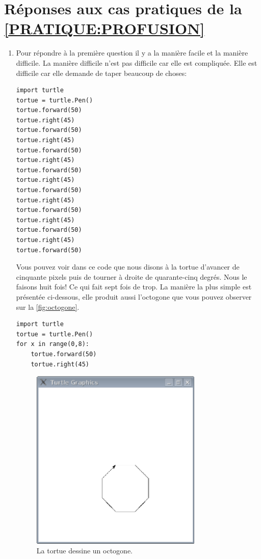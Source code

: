\section{Réponses aux cas pratiques de la \autoref{PRATIQUE:PROFUSION}\label{REPONSES:PROFUSION}}
\begin{enumerate}
\item Pour répondre à la première question il y a la manière facile et la manière difficile. La manière difficile n'est pas difficile car elle est compliquée. Elle est difficile car elle demande de taper beaucoup de choses:
\begin{Verbatim}[frame=single,rulecolor=\color{gray}, label=na pas saisir]
import turtle
tortue = turtle.Pen()
tortue.forward(50)
tortue.right(45)
tortue.forward(50)
tortue.right(45)
tortue.forward(50)
tortue.right(45)
tortue.forward(50)
tortue.right(45)
tortue.forward(50)
tortue.right(45)
tortue.forward(50)
tortue.right(45)
tortue.forward(50)
tortue.right(45)
tortue.forward(50)
\end{Verbatim}

Vous pouvez voir dans ce code que nous disons à la tortue d'avancer de cinquante pixels puis de tourner à droite de quarante-cinq degrés. Nous le faisons huit fois! Ce qui fait sept fois de trop. La manière la plus simple est présentée ci-dessous, elle produit aussi l'octogone que vous pouvez observer sur la \autoref{fig:octogone}.
\begin{Verbatim}[frame=single,rulecolor=\color{mbleu}, label=à taper]
import turtle
tortue = turtle.Pen()
for x in range(0,8):
    tortue.forward(50)
    tortue.right(45)
\end{Verbatim}

\begin{figure}
\begin{center}
\includegraphics[width=82mm]{images/octogone.eps}
\end{center}
\caption{La tortue dessine un octogone.}\label{fig:octogone}
\end{figure}


\end{enumerate}
